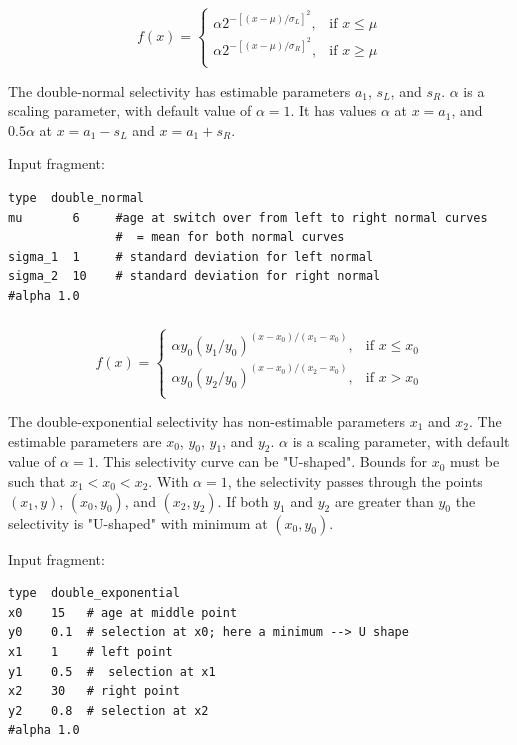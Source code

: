 \begin{equation}
  f(x) = \begin{cases}
    \alpha 2^{-[(x- \mu)/\sigma_L ]^2}, & \text{if $x \leq \mu$} \\
    \alpha 2^{-[(x- \mu)/\sigma_R ]^2}, & \text{if $x \ge \mu$}\\
  \end{cases}
\end{equation}

The double-normal selectivity has estimable parameters $a_1$, $s_L$, and $s_R$. $\alpha$ is a scaling parameter, with default value of $\alpha = 1$. It has values $\alpha$ at $x=a_1$, and $0.5 \alpha$ at $x=a_1-s_L$ and $x=a_1+s_R$.

Input fragment: {\small{\begin{verbatim}
type  double_normal
mu       6     #age at switch over from left to right normal curves
               #  = mean for both normal curves
sigma_1  1     # standard deviation for left normal
sigma_2  10    # standard deviation for right normal
#alpha 1.0
\end{verbatim}}}

\subsubsection[Double-exponential]{}

\begin{equation}
f(x)=\begin{cases}
	  \alpha y_0(y_1 / y_0)^{(x-x_0)/(x_1-x_0)}, & \text{if $x \le x_0$} \\
	  \alpha y_0(y_2 / y_0)^{(x-x_0)/(x_2-x_0)}, & \text{if $x > x_0$} \\
  \end{cases}
\end{equation}

The double-exponential selectivity has non-estimable parameters $x_1$ and $x_2$. The estimable parameters are $x_0$, $y_0$, $y_1$, and $y_2$.  $\alpha$ is a scaling parameter, with default value of $\alpha = 1$. This selectivity curve can be "U-shaped". Bounds for $x_0$ must be such that $x_1 < x_0 < x_2$. With $\alpha=1$, the selectivity passes through the points $(x_1, y)$, $(x_0, y_0)$, and $(x_2, y_2)$. If both $y_1$ and $y_2$ are greater than $y_0$ the selectivity is "U-shaped" with minimum at $(x_0, y_0)$.

Input fragment: {\small{\begin{verbatim}
type  double_exponential
x0    15   # age at middle point 
y0    0.1  # selection at x0; here a minimum --> U shape
x1    1    # left point
y1    0.5  #  selection at x1
x2    30   # right point
y2    0.8  # selection at x2
#alpha 1.0
\end{verbatim}}}

